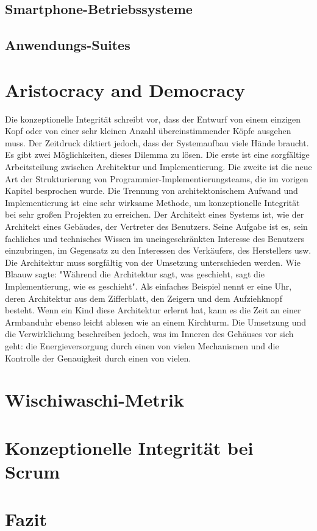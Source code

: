 \documentclass[a4paper, ngerman, 12pt, usenames, dvipsnames]{article}
\begin{document}
\subsection{Smartphone-Betriebssysteme}

\subsection{Anwendungs-Suites}

\section{Aristocracy and Democracy}
Die konzeptionelle Integrität schreibt vor, dass der Entwurf von einem einzigen Kopf oder von einer sehr kleinen Anzahl übereinstimmender Köpfe ausgehen muss.
Der Zeitdruck diktiert jedoch, dass der Systemaufbau viele Hände braucht. Es gibt zwei Möglichkeiten, dieses Dilemma zu lösen. Die erste ist eine sorgfältige Arbeitsteilung zwischen Architektur und Implementierung. Die zweite ist die neue Art der Strukturierung von Programmier-Implementierungsteams, die im vorigen Kapitel besprochen wurde.
Die Trennung von architektonischem Aufwand und Implementierung ist eine sehr wirksame Methode, um konzeptionelle Integrität bei sehr großen Projekten zu erreichen.
Der Architekt eines Systems ist, wie der Architekt eines Gebäudes, der Vertreter des Benutzers. Seine Aufgabe ist es, sein fachliches und technisches Wissen im uneingeschränkten Interesse des Benutzers einzubringen, im Gegensatz zu den Interessen des Verkäufers, des Herstellers usw. Die Architektur muss sorgfältig von der Umsetzung unterschieden werden. Wie Blaauw sagte: "Während die Architektur sagt, was geschieht, sagt die Implementierung, wie es geschieht". Als einfaches Beispiel nennt er eine Uhr, deren Architektur aus dem Zifferblatt, den Zeigern und dem Aufziehknopf besteht. Wenn ein Kind diese Architektur erlernt hat, kann es die Zeit an einer Armbanduhr ebenso leicht ablesen wie an einem Kirchturm. Die Umsetzung und die Verwirklichung beschreiben jedoch, was im Inneren des Gehäuses vor sich geht: die Energieversorgung durch einen von vielen Mechanismen und die Kontrolle der Genauigkeit durch einen von vielen.

\section{Wischiwaschi-Metrik}
\section{Konzeptionelle Integrität bei Scrum}
\section{Fazit}



\end{document}
